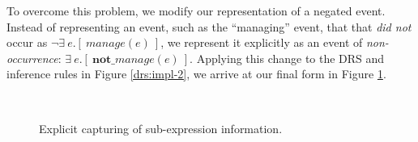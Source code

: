 To overcome this problem, we modify our representation of a negated event. 
Instead of representing an event, such as the ``managing'' event, that that
{\it did not} occur as $\lnot \exists~ e.[~ manage(e) ~]$, we represent it
explicitly as an event of {\it non-occurrence}: $\exists~ e.[~
\textbf{not\_}manage(e) ~]$.  Applying this change to the DRS and inference
rules in Figure \ref{drs:impl-2}, we arrive at our final form in Figure
\ref{drs:impl-3}.

\begin{figure}
  \centering
  ~~~~~~~~~
  \caption{Explicit capturing of sub-expression information.}
  \label{drs:impl-3}
\end{figure}

